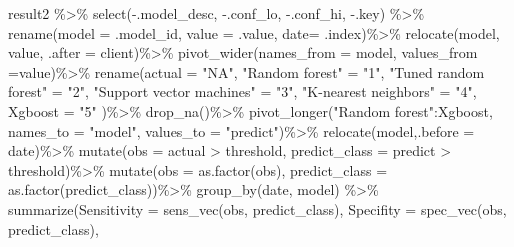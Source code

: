 \documentclass[
]{article}
\newenvironment{Shaded}{\begin{snugshade}}{\end{snugshade}}
\newcommand{\AttributeTok}[1]{\textcolor[rgb]{0.77,0.63,0.00}{#1}}
\newcommand{\FunctionTok}[1]{\textcolor[rgb]{0.00,0.00,0.00}{#1}}
\newcommand{\NormalTok}[1]{#1}
\newcommand{\OtherTok}[1]{\textcolor[rgb]{0.56,0.35,0.01}{#1}}
\newcommand{\SpecialCharTok}[1]{\textcolor[rgb]{0.00,0.00,0.00}{#1}}
\newcommand{\StringTok}[1]{\textcolor[rgb]{0.31,0.60,0.02}{#1}}
\begin{document}
\begin{Shaded}
\begin{Highlighting}[]
\NormalTok{result2 }\SpecialCharTok{\%\textgreater{}\%}
  \FunctionTok{select}\NormalTok{(}\SpecialCharTok{{-}}\NormalTok{.model\_desc, }\SpecialCharTok{{-}}\NormalTok{.conf\_lo, }\SpecialCharTok{{-}}\NormalTok{.conf\_hi, }\SpecialCharTok{{-}}\NormalTok{.key) }\SpecialCharTok{\%\textgreater{}\%}
  \FunctionTok{rename}\NormalTok{(}\AttributeTok{model =}\NormalTok{ .model\_id, }\AttributeTok{value =}\NormalTok{ .value, }\AttributeTok{date=}\NormalTok{ .index)}\SpecialCharTok{\%\textgreater{}\%}
  \FunctionTok{relocate}\NormalTok{(model, value, }\AttributeTok{.after =}\NormalTok{ client)}\SpecialCharTok{\%\textgreater{}\%}
  \FunctionTok{pivot\_wider}\NormalTok{(}\AttributeTok{names\_from =}\NormalTok{ model, }\AttributeTok{values\_from =}\NormalTok{value)}\SpecialCharTok{\%\textgreater{}\%}
  \FunctionTok{rename}\NormalTok{(}\AttributeTok{actual =} \StringTok{"NA"}\NormalTok{, }\StringTok{"Random forest"} \OtherTok{=} \StringTok{"1"}\NormalTok{, }\StringTok{"Tuned random forest"} \OtherTok{=} \StringTok{"2"}\NormalTok{, }
      \StringTok{"Support vector machines"} \OtherTok{=} \StringTok{"3"}\NormalTok{, }\StringTok{"K{-}nearest neighbors"} \OtherTok{=} \StringTok{"4"}\NormalTok{, }\AttributeTok{Xgboost =} \StringTok{"5"}\NormalTok{ )}\SpecialCharTok{\%\textgreater{}\%}
  \FunctionTok{drop\_na}\NormalTok{()}\SpecialCharTok{\%\textgreater{}\%}
  \FunctionTok{pivot\_longer}\NormalTok{(}\StringTok{"Random forest"}\SpecialCharTok{:}\NormalTok{Xgboost, }\AttributeTok{names\_to =} \StringTok{"model"}\NormalTok{, }\AttributeTok{values\_to =} \StringTok{"predict"}\NormalTok{)}\SpecialCharTok{\%\textgreater{}\%}
  \FunctionTok{relocate}\NormalTok{(model,}\AttributeTok{.before =}\NormalTok{ date)}\SpecialCharTok{\%\textgreater{}\%}
  \FunctionTok{mutate}\NormalTok{(}\AttributeTok{obs =}\NormalTok{ actual }\SpecialCharTok{\textgreater{}}\NormalTok{ threshold, }\AttributeTok{predict\_class =}\NormalTok{ predict }\SpecialCharTok{\textgreater{}}\NormalTok{ threshold)}\SpecialCharTok{\%\textgreater{}\%}
  \FunctionTok{mutate}\NormalTok{(}\AttributeTok{obs =} \FunctionTok{as.factor}\NormalTok{(obs), }\AttributeTok{predict\_class =} \FunctionTok{as.factor}\NormalTok{(predict\_class))}\SpecialCharTok{\%\textgreater{}\%}
  \FunctionTok{group\_by}\NormalTok{(date, model) }\SpecialCharTok{\%\textgreater{}\%}
  \FunctionTok{summarize}\NormalTok{(}\AttributeTok{Sensitivity =} \FunctionTok{sens\_vec}\NormalTok{(obs, predict\_class),}
            \AttributeTok{Specifity =} \FunctionTok{spec\_vec}\NormalTok{(obs, predict\_class),}

\end{Highlighting}
\end{Shaded}
\end{document}
